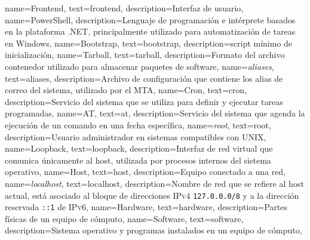 {
  name={Frontend},
  text={frontend},
  description={Interfaz de usuario},
}
{
  name={PowerShell},
  description={Lenguaje de programaci\'{o}n e int\'{e}rprete basados en la plataforma .NET, principalmente utilizado para automatizaci\'{o}n de tareas en Windows},
}
{
  name={Bootstrap},
  text={bootstrap},
  description={\Gls{script} m\'{i}nimo de inicializaci\'{o}n},
}
{
  name={Tarball},
  text={tarball},
  description={Formato del archivo contenedor utilizado para almacenar paquetes de \gls{software}},
}
{
  name={\emph{aliases}},
  text={aliases},
  description={Archivo de configuraci\'{o}n que contiene los alias de correo del sistema, utilizado por el \gls{MTA}},
}
{
  name={Cron},
  text={cron},
  description={Servicio del sistema que se utiliza para definir y ejecutar tareas programadas},
}
{
  name={AT},
  text={at},
  description={Servicio del sistema que agenda la ejecuci\'{o}n de un comando en una fecha espec\'{i}fica},
}
{
  name={\emph{root}},
  text={root},
  description={Usuario administrador en sistemas compatibles con \textsc{UNIX}},
}
{
  name={Loopback},
  text={loopback},
  description={Interfaz de red virtual que comunica \'{u}nicamente al \gls{host}, utilizada por procesos internos del sistema operativo},
}
{
  name={Host},
  text={host},
  description={Equipo conectado a una red},
}
{
  name={\emph{localhost}},
  text={localhost},
  description={Nombre de red que se refiere al \gls{host} actual, est\'{a} asociado al bloque de direcciones \textsc{IPv4} \texttt{127.0.0.0/8} y a la direcci\'{o}n reservada \texttt{::1} de \textsc{IPv6}},
}
{
  name={Hardware},
  text={hardware},
  description={Partes f\'{i}sicas de un equipo de c\'{o}mputo},
}
{
  name={Software},
  text={software},
  description={Sistema operativo y programas instalados en un equipo de c\'{o}mputo},
}
